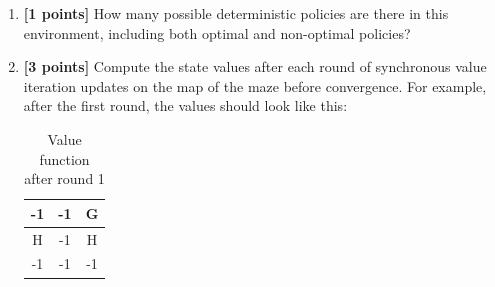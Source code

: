\documentclass[11pt]{article}
\numberwithin{equation}{section} %
\numberwithin{figure}{section} %
\numberwithin{table}{section} %
\begin{document}
\begin{enumerate}
\item \textbf{[1 points]} How many possible deterministic policies are there in this environment, including both optimal and non-optimal policies?

\begin{tcolorbox}[fit,height=3cm, width=\linewidth, blank, borderline={1pt}{-2pt},nobeforeafter]
\end{tcolorbox}


\newpage

\item \textbf{[3 points]} Compute the state values after each round of synchronous value iteration updates on the map of the maze before convergence. For example, after the first round, the values should look like this:

\begin{table}[H]
\begin{center}
  \begin{tabular}{ | c | c | c | }
    \hline
    -1 & -1 & G\\ \hline
    H & -1 & H \\ \hline
    -1 & -1 & -1 \\ \hline
  \end{tabular}
 \caption{Value function after round 1}
\end{center}
\end{table}

\begin{tcolorbox}[fit,height=3.5cm, width=\linewidth, blank, borderline={1pt}{-2pt},nobeforeafter]
    \def\arraystretch{1.5}
    

\end{tcolorbox}
\end{enumerate}
\end{document}
